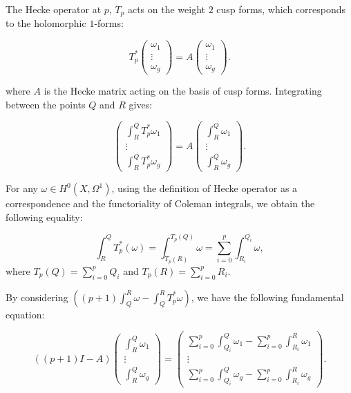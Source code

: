 The Hecke operator at $p$, $T_p$ acts on the weight $2$ cusp forms, which corresponds to the holomorphic $1$-forms:

\[T_p^*\begin{pmatrix} \omega_1 \\\vdots \\ \omega_g \end{pmatrix}  = A\begin{pmatrix} \omega_1 \\\vdots \\ \omega_g \end{pmatrix}.\]

where $A$ is the Hecke matrix acting on the basis of cusp forms. Integrating between the points $Q$ and $R$ gives:

\[\begin{pmatrix} \int^Q_RT_p^*\omega_1 \\\vdots \\ \int^Q_RT_p^*\omega_g \end{pmatrix}  = A\begin{pmatrix} \int^Q_R\omega_1 \\\vdots \\ \int^Q_R\omega_g \end{pmatrix}.\]


For any $\omega \in H^0(X,\Omega^1)$, using the definition of Hecke operator as a correspondence and the functoriality of Coleman integrals, we obtain the following equality:

\[\int^Q_R T_p^*(\omega) = \int^{T_p(Q)}_{T_p(R)} \omega = \sum_{i=0}^{p} \int^{Q_i}_{R_i} \omega,\] where $T_p(Q) = \sum_{i=0}^p Q_i$ and  $T_p(R) = \sum_{i=0}^p R_i$.

By considering $((p+1)\int_{Q}^R \omega - \int_Q^R T_p^* \omega)$, we have the following fundamental equation:

\begin{equation}\label{eq:fundamental-eqn}
   ((p+1)I-A)\begin{pmatrix} \int^Q_R\omega_1 \\\vdots \\ \int^Q_R\omega_g \end{pmatrix} =  \begin{pmatrix} \sum_{i=0}^{p}\int^Q_{Q_i} \omega_1 - \sum_{i=0}^{p}\int^R_{R_i} \omega_1 \\\vdots \\ \sum_{i=0}^{p}\int^Q_{Q_i} \omega_g - \sum_{i=0}^{p}\int^R_{R_i} \omega_g \end{pmatrix}.
\end{equation}

